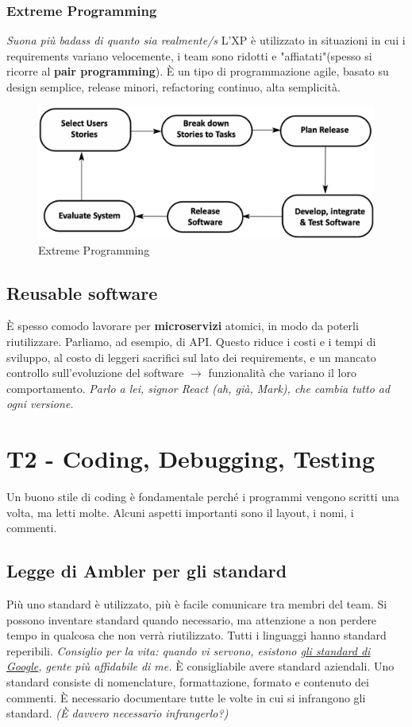 \documentclass[11pt]{article}
\begin{document}
\subsubsection{Extreme Programming}
\textit{Suona più badass di quanto sia realmente/s} L'XP è utilizzato in situazioni in cui i requirements variano velocemente, i team sono ridotti e "affiatati"(spesso si ricorre al \textbf{pair programming}). È un tipo di programmazione agile, basato su design semplice, release minori, refactoring continuo, alta semplicità. 
\begin{figure}[H]
    \centering
    \includegraphics[width=\linewidth]{res/teoria/ExtremeProgramming.png}
    \caption{Extreme Programming}
\end{figure}
\subsection{Reusable software}
È spesso comodo lavorare per \textbf{microservizi} atomici, in modo da poterli riutilizzare. Parliamo, ad esempio, di API. Questo riduce i costi e i tempi di sviluppo, al costo di leggeri sacrifici sul lato dei requirements, e un mancato controllo sull'evoluzione del software $\rightarrow$ funzionalità che variano il loro comportamento. \textit{Parlo a lei, signor React (ah, già, Mark), che cambia tutto ad ogni versione.} 

\section{T2 - Coding, Debugging, Testing} 
Un buono stile di coding è fondamentale perché i programmi vengono scritti una volta, ma letti molte. Alcuni aspetti importanti sono il layout, i nomi, i commenti. 
\subsection{Legge di Ambler per gli standard}
Più uno standard è utilizzato, più è facile comunicare tra membri del team. Si possono inventare standard quando necessario, ma attenzione a non perdere tempo in qualcosa che non verrà riutilizzato. 
Tutti i linguaggi hanno standard reperibili. \textit{Consiglio per la vita: quando vi servono, esistono \href{https://google.github.io/styleguide/}{gli standard di Google}, gente più affidabile di me.} È consigliabile avere standard aziendali. Uno standard consiste di nomenclature, formattazione, formato e contenuto dei commenti. È necessario documentare tutte le volte in cui si infrangono gli standard. \textit{(È davvero necessario infrangerlo?)}
\end{document}
